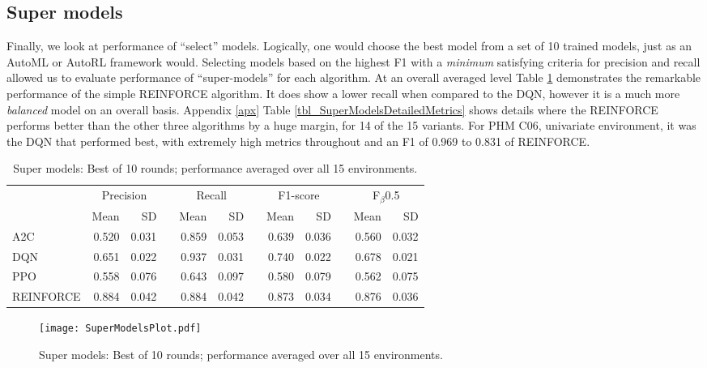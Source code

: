 \documentclass[referee, sn-mathphys-num]{sn-jnl}
\newcommand{\rowspace}[1]{\renewcommand{\arraystretch}{#1}}
\begin{document}
	\subsection{Super models}
	Finally, we look at performance of ``select'' models. Logically, one would choose the best model from a set of 10 trained models, just as an AutoML or AutoRL framework would. Selecting models based on the highest F1 with a \textit{minimum} satisfying criteria for precision and recall allowed us to evaluate performance of ``super-models'' for each algorithm. At an overall averaged level Table \ref{tbl_supermodels} demonstrates the remarkable performance of the simple REINFORCE algorithm. It does show a lower recall when compared to the DQN, however it is a much more \textit{balanced} model on an overall basis. Appendix \ref{apx} Table \ref{tbl_SuperModelsDetailedMetrics} shows details where the REINFORCE performs better than the other three algorithms by a huge margin, for 14 of the 15 variants. For PHM C06, univariate environment, it was the DQN that performed best, with extremely high metrics throughout and an F1 of 0.969 to 0.831 of REINFORCE.
	\begin{table}
		\rowspace{1.3}
		\caption{Super models: Best of 10 rounds; performance averaged over all 15 environments.}
		{\begin{tabular}{@{}l rr c rr c rr c rr@{}}
				\arrayrulecolor{black!40}\toprule
				& \multicolumn{2}{c}{Precision} & \phantom{i} & \multicolumn{2}{c}{Recall} & \phantom{i} & \multicolumn{2}{c}{F1-score} & \phantom{i} & \multicolumn{2}{c}{F$_\beta$0.5} \\
				\cmidrule{2-3} \cmidrule{5-6} \cmidrule{8-9} \cmidrule{11-12} 
				
				&Mean &SD & &Mean &SD & &Mean &SD& &Mean & SD\\ \midrule
				A2C & 0.520 & 0.031 & &0.859 & 0.053 & & 0.639 & 0.036 & &0.560 &0.032 \\
				DQN & 0.651 & 0.022 & &0.937 & 0.031 & & 0.740 & 0.022 & &0.678 &0.021 \\
				PPO & 0.558 & 0.076 & &0.643 & 0.097 & & 0.580 & 0.079 & &0.562 &0.075 \\
				REINFORCE & \textcolor{dblue}{0.884} & 0.042 & &\textcolor{dblue}{0.884} & 0.042 & & \textcolor{dblue}{0.873} & 0.034 & &\textcolor{dblue}{0.876} &0.036 \\
				\bottomrule
		\end{tabular}}
		\label{tbl_supermodels}
	\end{table}
	\begin{figure}[htb]
		\centering
		\texttt{[image: SuperModelsPlot.pdf]}  
		\caption{Super models: Best of 10 rounds; performance averaged over all 15 environments.}
		\label{fig_supermodels}
	\end{figure}
	
\end{document}
